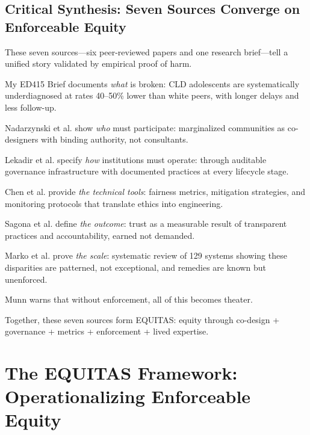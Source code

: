 \documentclass[12pt,a4paper]{article}
\begin{document}
\subsection{Critical Synthesis: Seven Sources Converge on Enforceable Equity}

\begin{tcolorbox}[colback=noteback,colframe=noteborder,title=\textbf{The Convergence: From Harm to Systems Change}]
These seven sources—six peer-reviewed papers and one research brief—tell a unified story validated by empirical proof of harm.

My ED415 Brief documents \textit{what} is broken: CLD adolescents are systematically underdiagnosed at rates 40--50\% lower than white peers, with longer delays and less follow-up.\cite{garcia_ed415} 

Nadarzynski et al. show \textit{who} must participate: marginalized communities as co-designers with binding authority, not consultants.\cite{nadarzynski2024}

Lekadir et al. specify \textit{how} institutions must operate: through auditable governance infrastructure with documented practices at every lifecycle stage.\cite{lekadir2025}

Chen et al. provide \textit{the technical tools}: fairness metrics, mitigation strategies, and monitoring protocols that translate ethics into engineering.\cite{chen2023}

Sagona et al. define \textit{the outcome}: trust as a measurable result of transparent practices and accountability, earned not demanded.\cite{sagona2025}

Marko et al. prove \textit{the scale}: systematic review of 129 systems showing these disparities are patterned, not exceptional, and remedies are known but unenforced.\cite{marko2025}

Munn warns that without enforcement, all of this becomes theater. \cite{munn_idai700}

Together, these seven sources form EQUITAS: equity through co-design + governance + metrics + enforcement + lived expertise.
\end{tcolorbox}

\section{The EQUITAS Framework: Operationalizing Enforceable Equity}
\end{document}

